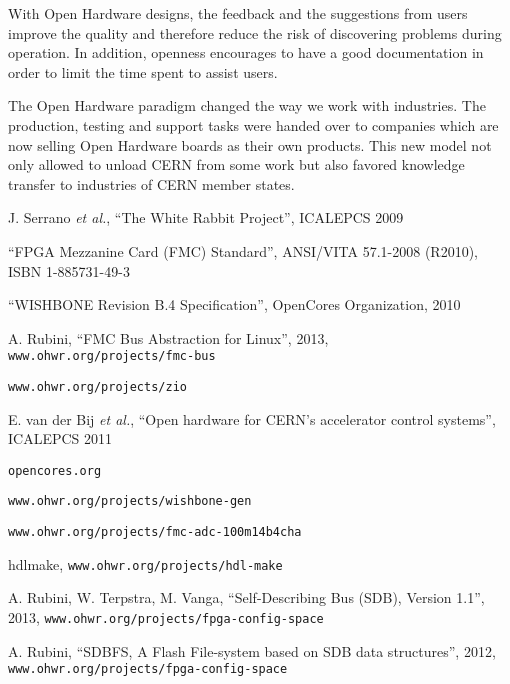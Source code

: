 \documentclass{JAC2003}
\begin{document}
With Open Hardware designs, the feedback and the suggestions from users improve the quality and therefore reduce the risk of discovering problems during operation.
In addition, openness encourages to have a good documentation in order to limit the time spent to assist users.

The Open Hardware paradigm changed the way we work with industries. The production, testing and support tasks were handed over to companies which are now selling Open Hardware boards as their own products.
This new model not only allowed to unload CERN from some work but also favored knowledge transfer to industries of CERN member states.





\begin{thebibliography}{99} %

J. Serrano \textit{et al.}, ``The White Rabbit Project'', ICALEPCS 2009

``FPGA Mezzanine Card (FMC) Standard'', ANSI/VITA 57.1-2008 (R2010), ISBN 1-885731-49-3

``WISHBONE Revision B.4 Specification'', OpenCores Organization, 2010

A. Rubini, ``FMC Bus Abstraction for Linux'', 2013, \texttt{www.ohwr.org/projects/fmc-bus}

\texttt{www.ohwr.org/projects/zio}

E. van der Bij \textit{et al.}, ``Open hardware for CERN's accelerator control systems'', ICALEPCS 2011

\texttt{opencores.org}


\texttt{www.ohwr.org/projects/wishbone-gen}

\texttt{www.ohwr.org/projects/fmc-adc-100m14b4cha}

hdlmake, \texttt{www.ohwr.org/projects/hdl-make}

A. Rubini, W. Terpstra, M. Vanga, ``Self-Describing Bus (SDB), Version 1.1'', 2013, \texttt{www.ohwr.org/projects/fpga-config-space}

A. Rubini, ``SDBFS, A Flash File-system based on SDB data structures'', 2012, \texttt{www.ohwr.org/projects/fpga-config-space}

\end{thebibliography}
\end{document}

